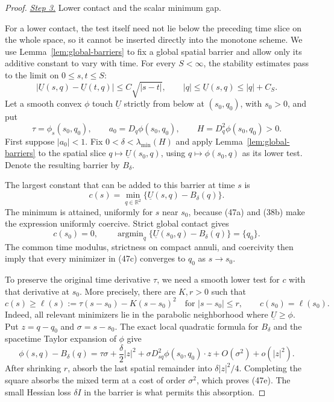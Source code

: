 \documentclass{aomart}
\theoremstyle{definition}
\newcommand{\1}{\mathbf 1}
\begin{document}
\begin{proof}
\smallskip\noindent
\underline{\textit{Step 3.}} Lower contact and the scalar minimum gap.

For a lower contact, the test itself need not lie below the preceding
time slice on the whole space, so it cannot be inserted directly into
the monotone scheme.  We use Lemma~\ref{lem:global-barriers} to fix
a global spatial barrier and allow only its additive constant to vary
with time.  For every $S<\infty$, the stability estimates pass to the
limit on $0\leq s,t\leq S$:
\begin{equation}
|\underline U(s,q)-\underline U(t,q)|
\leq C\sqrt{|s-t|},\qquad
|q|\leq\underline U(s,q)\leq|q|+C_ S.
\tag{47a}
\end{equation}
Let a smooth convex $\phi$ touch $\underline U$ strictly from
below at $(s_ 0,q_ 0)$, with $s_ 0>0$, and put
\begin{equation}
\tau=\phi_ s(s_ 0,q_ 0),\qquad
a_ 0=D_ q\phi(s_ 0,q_ 0),\qquad
H=D_ q^2\phi(s_ 0,q_ 0)>0.
\tag{47b}
\end{equation}
First suppose $|a_ 0|<1$.  Fix
$0<\delta<\lambda_ {\min}(H)$ and apply Lemma~\ref{lem:global-barriers} to the spatial slice
$q\mapsto\underline U(s_ 0,q)$, using
$q\mapsto\phi(s_ 0,q)$ as its lower test.  Denote the resulting
barrier by $B_ \delta$.

The largest constant that can be added to this barrier at time $s$ is
\begin{equation}
c(s)=\min_ {q\in\mathbb R^2}
\{\underline U(s,q)-B_ \delta(q)\}.
\tag{47c}
\end{equation}
The minimum is attained, uniformly for $s$ near $s_ 0$, because
(47a) and (38b) make the expression uniformly coercive.  Strict global
contact gives
\begin{equation}
c(s_ 0)=0,\qquad
\operatorname {argmin}_ q
\{\underline U(s_ 0,q)-B_ \delta(q)\}=\{q_ 0\}.
\tag{47d}
\end{equation}
The common time modulus, strictness on compact annuli, and coercivity
then imply that every minimizer in (47c) converges to $q_ 0$ as
$s\to s_ 0$.

To preserve the original time derivative $\tau$, we need a smooth
lower test for $c$ with that derivative at $s_0$.  More precisely,
there are $K,r>0$ such that
\begin{equation}
c(s)\geq\ell(s):=\tau(s-s_ 0)-K(s-s_ 0)^2
\quad\text{for }|s-s_ 0|\leq r,\qquad c(s_ 0)=\ell(s_ 0).
\tag{47e}
\end{equation}
Indeed, all relevant minimizers lie in the parabolic neighborhood
where $\underline U\geq\phi$.  Put $z=q-q_ 0$ and
$\sigma=s-s_ 0$.  The exact local quadratic formula for $B_ \delta$
and the spacetime Taylor expansion of $\phi$ give
\begin{equation}
\phi(s,q)-B_ \delta(q)
=\tau\sigma+\frac\delta2|z|^2
+\sigma D^2_ {sq}\phi(s_ 0,q_ 0)\cdot z
+O(\sigma^2)+o(|z|^2).
\tag{47f}
\end{equation}
After shrinking $r$, absorb the last spatial remainder into
$\delta|z|^2/4$.  Completing the square absorbs the mixed term at a
cost of order $\sigma^2$, which proves (47e).  The small Hessian loss
$\delta I$ in the barrier is what permits this absorption.


\end{proof}
\end{document}
